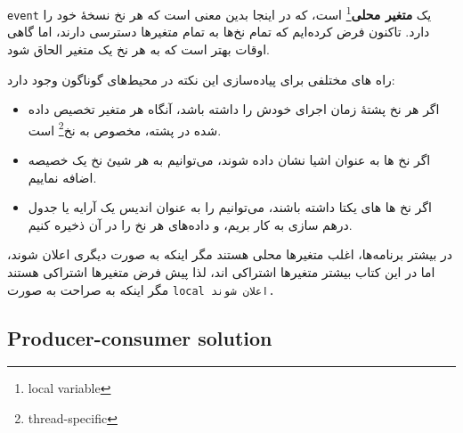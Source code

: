 \documentclass{book}
\newcommand{\clearemptydoublepage}{\newpage\cleardoublepage}
\begin{document}
    {\tt event}
    یک \textbf{متغیر محلی}\footnote{local variable} است، که در اینجا بدین معنی است که هر نخ نسخهٔ خود را دارد.
    تاکنون فرض کرده‌ایم که تمام نخ‌ها به تمام متغیرها دسترسی دارند، اما گاهی اوقات بهتر است که به هر نخ یک متغیر الحاق شود.

    راه های مختلفی برای پیاده‌سازی این نکته در محیط‌های گوناگون وجود دارد:
    
\begin{itemize}

\item 
    اگر هر نخ پشتهٔ زمان اجرای خودش را داشته باشد، آنگاه هر متغیر تخصیص داده شده در پشته، 
    مخصوص به نخ\footnote{thread-specific} است.

\item 
    اگر نخ ها به عنوان اشیا نشان داده شوند، می‌توانیم به هر شیئ نخ یک خصیصه اضافه نماییم.

\item 
    اگر نخ ها های یکتا داشته باشند، می‌توانیم  را به عنوان اندیس یک آرایه یا جدول درهم سازی به کار بریم، 
    و داده‌های هر نخ را در آن ذخیره کنیم.

\end{itemize}

    در بیشتر برنامه‌ها، اغلب متغیرها محلی هستند مگر اینکه به صورت دیگری اعلان شوند، 
    اما در این کتاب بیشتر متغیرها اشتراکی اند، لذا پیش فرض متغیرها اشتراکی هستند مگر اینکه به صراحت به صورت \tt{local} اعلان شوند.


\clearemptydoublepage
\subsection{Producer-consumer solution}
\end{document}
